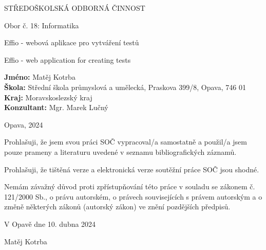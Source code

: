 \documentclass[12pt, a4paper,
openright
]{report}
\newcommand\city{Opava} %
\newcommand\district{Moravskoslezský kraj} %
\newcommand\specialization{Obor č. 18: Informatika} %
\newcommand\school{ Střední škola průmyslová a umělecká, Praskova 399/8, Opava, 746 01} %
\newcommand\consultant{Mgr. Marek Lučný} %
\newcommand\authorName{Matěj Kotrba}  %
\newcommand\publicationYear{2024} %
\newcommand\mainTitle{Effio - webová aplikace pro vytváření testů} %
\begin{document}
{\bfseries %
    \begin{center}
        \LARGE{STŘEDOŠKOLSKÁ ODBORNÁ ČINNOST}

        \vspace{14pt}
        {\large %
            \specialization %
        } %

        \vspace{0.3 \textheight}

        \LARGE{ %
        \mainTitle
        }

        \LARGE{ %
        Effio - web application for creating tests
        }%

        \vspace{0.24\textheight}
    \end{center}  
}%
{\Large %
    \noindent\textbf{Jméno:} \authorName\\
    \textbf{Škola:} \school\\
    \textbf{Kraj:} \district\\
    \textbf{Konzultant:} \consultant\\
} %

\noindent \city, \publicationYear

\cleardoublepage


\noindent Prohlašuji, že jsem svou práci SOČ vypracoval/a samostatně a použil/a jsem pouze prameny a literaturu uvedené v seznamu bibliografických záznamů.

\noindent Prohlašuji, že tištěná verze a elektronická verze soutěžní práce SOČ jsou shodné. 

\noindent Nemám závažný důvod proti zpřístupňování této práce v souladu se zákonem č. 121/2000 Sb., o právu autorském, o právech souvisejících s právem autorským a o změně některých zákonů (autorský zákon) ve znění pozdějších předpisů. 

\vspace{24 pt}

\noindent V Opavě dne 10. dubna 2024 \dotfill{} 

\hspace{8cm} \authorName

\cleardoublepage

\end{document}

